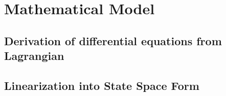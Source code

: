 




\section{Mathematical Model}

\subsection{Derivation of differential equations from Lagrangian}
\subsection{Linearization into State Space Form}
